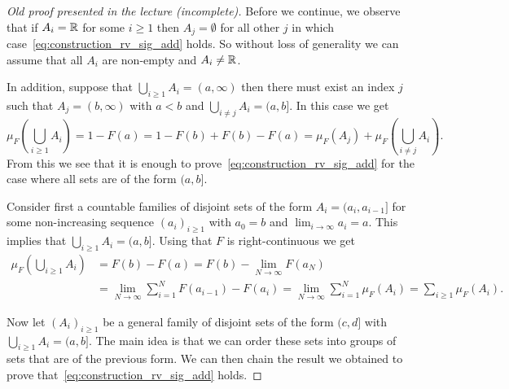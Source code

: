 \begin{proof}[Old proof presented in the lecture (incomplete)]
Before we continue, we observe that if $A_i = \mathbb R$ for some $i \ge 1$ then $A_j = \emptyset$ for all other $j$ in which case~\eqref{eq:construction_rv_sig_add} holds. So without loss of generality we can assume that all $A_i$ are non-empty and $A_i \ne \mathbb R$.

In addition, suppose that $\bigcup_{i \ge 1} A_i = (a, \infty)$ then there must exist an index $j$ such that $A_j = (b,\infty)$ with $a < b$ and $\bigcup_{i \ne j} A_i = (a, b]$. In this case we get
\[
	\mu_F(\bigcup_{i \ge 1} A_i) = 1 - F(a) = 1 - F(b) + F(b) - F(a) = \mu_F(A_j) + \mu_F(\bigcup_{i \ne j} A_i).
\]
From this we see that it is enough to prove~\eqref{eq:construction_rv_sig_add} for the case where all sets are of the form $(a,b]$.

%


Consider first a countable families of disjoint sets of the form $A_i = (a_i, a_{i-1}]$ for some non-increasing sequence $(a_i)_{i \ge 1}$ with $a_0 = b$ and $\lim_{i \to \infty} a_i = a$. This implies that $\bigcup_{i \ge 1} A_i = (a, b]$. Using that $F$ is right-continuous we get
\begin{align*}
	\mu_F(\bigcup_{i \ge 1} A_i) &= F(b) - F(a) = F(b) - \lim_{N \to \infty} F(a_N) \\
	&= \lim_{N \to \infty} \sum_{i = 1}^N F(a_{i-1}) - F(a_i) = \lim_{N \to \infty} \sum_{i = 1}^N \mu_F(A_i) 
	= \sum_{i \ge 1} \mu_F(A_i).
\end{align*}

Now let $(A_i)_{i \ge 1}$ be a general family of disjoint sets of the form $(c,d]$ with $\bigcup_{i \ge 1} A_i = (a, b]$. The main idea is that we can order these sets into groups of sets that are of the previous form. We can then chain the result we obtained to prove that~\eqref{eq:construction_rv_sig_add} holds.


\end{proof}
